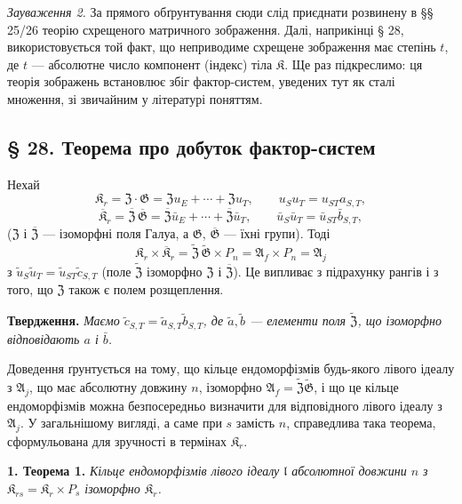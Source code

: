 \documentclass[11pt]{article}
\begin{document}
\noindent\emph{Зауваження 2.} За прямого обґрунтування сюди слід приєднати розвинену в §§ 25/26 теорію схрещеного матричного зображення. Далі, наприкінці § 28, використовується той факт, що неприводиме схрещене зображення має степінь \(t\), де \(t\) --- абсолютне число компонент (індекс) тіла \(\mathfrak K\). Ще раз підкреслимо: ця теорія зображень встановлює збіг фактор-систем, уведених тут як сталі множення, зі звичайним у літературі поняттям.

\subsection*{§ 28. Теорема про добуток фактор-систем}\label{produktsatz-fuer-faktorensysteme}

Нехай
\[
\mathfrak K_r=\mathfrak Z\cdot\mathfrak G
=\mathfrak Zu_E+\cdots+\mathfrak Zu_T,
\qquad u_Su_T=u_{ST}a_{S,T},
\]
\[
\overline{\mathfrak K}_r
=\overline{\mathfrak Z}\,\overline{\mathfrak G}
=\overline{\mathfrak Z}\bar u_E+\cdots+\overline{\mathfrak Z}\bar u_T,
\qquad
\bar u_S\bar u_T=\bar u_{ST}\bar b_{S,T},
\]
(\(\mathfrak Z\) і \(\overline{\mathfrak Z}\) --- ізоморфні поля Галуа, а \(\mathfrak G\), \(\overline{\mathfrak G}\) --- їхні групи). Тоді
\[
\mathfrak K_r\times\overline{\mathfrak K}_r
=\widetilde{\mathfrak Z}\,\widetilde{\mathfrak G}\times P_n
=\mathfrak A_f\times P_n
=\mathfrak A_j
\]
з \(\tilde u_S\tilde u_T=\tilde u_{ST}\tilde c_{S,T}\) (поле \(\widetilde{\mathfrak Z}\) ізоморфно \(\mathfrak Z\) і \(\overline{\mathfrak Z}\)). Це випливає з підрахунку рангів і з того, що \(\mathfrak Z\) також є полем розщеплення.

\noindent\textbf{Твердження.} \emph{Маємо \(\tilde c_{S,T}=\tilde a_{S,T}\tilde b_{S,T}\), де \(\tilde a,\tilde b\) --- елементи поля \(\widetilde{\mathfrak Z}\), що ізоморфно відповідають \(a\) і \(\bar b\).}

Доведення ґрунтується на тому, що кільце ендоморфізмів будь-якого лівого ідеалу з \(\mathfrak A_j\), що має абсолютну довжину \(n\), ізоморфно \(\mathfrak A_f=\widetilde{\mathfrak Z}\widetilde{\mathfrak G}\), і що це кільце ендоморфізмів можна безпосередньо визначити для відповідного лівого ідеалу з \(\mathfrak A_j\). У загальнішому вигляді, а саме при \(s\) замість \(n\), справедлива така теорема, сформульована для зручності в термінах \(\mathfrak K_r\).

\noindent\textbf{1. Теорема 1.} \emph{Кільце ендоморфізмів лівого ідеалу \(\mathfrak l\) абсолютної довжини \(n\) з \(\mathfrak K_{rs}=\mathfrak K_r\times P_s\) ізоморфно \(\mathfrak K_r\).}
\end{document}

